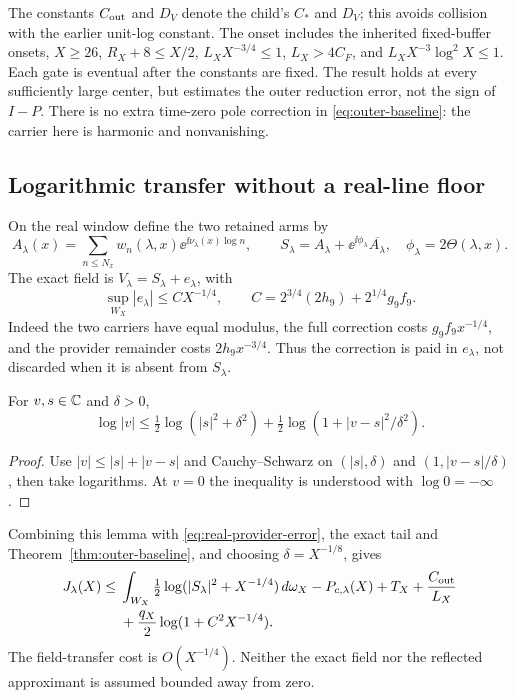 The constants \(C_{\rm out}\) and \(D_V\) denote the child's
\(C_*\) and \(D_V\); this avoids collision with the earlier
unit-log constant. The onset includes the inherited fixed-buffer
onsets, \(X\ge26\), \(R_X+8\le X/2\),
\(L_XX^{-3/4}\le1\), \(L_X>4C_F\), and
\(L_XX^{-3}\log^2X\le1\). Each gate is eventual after the constants
are fixed. The result holds at every sufficiently large center, but
estimates the outer reduction error, not the sign of \(I-P\).
There is no extra time-zero pole correction in
\eqref{eq:outer-baseline}: the carrier here is harmonic and nonvanishing.

\subsection{Logarithmic transfer without a real-line floor}
On the real window define the two retained arms by
\begin{equation}\label{eq:real-two-arms}
 A_\lambda(x)=\sum_{n\le N_x}w_n(\lambda,x)
                  \ee^{\ii\nu_\lambda(x)\log n},\qquad
 S_\lambda=A_\lambda+\ee^{\ii\phi_\lambda}\overline{A_\lambda},
 \quad\phi_\lambda=2\Theta(\lambda,x).
\end{equation}
The exact field is \(V_\lambda=S_\lambda+e_\lambda\), with
\begin{equation}\label{eq:real-provider-error}
 \sup_{W_X}|e_\lambda|\le C X^{-1/4},\qquad
 C=2^{3/4}(2h_9)+2^{1/4}g_9f_9.
\end{equation}
Indeed the two carriers have equal modulus, the full correction costs
\(g_9f_9x^{-1/4}\), and the provider remainder costs
\(2h_9x^{-3/4}\). Thus the correction is paid in \(e_\lambda\),
not discarded when it is absent from \(S_\lambda\).

\begin{lemma}\label{lem:upper-log-transfer}
For \(v,s\in\mathbb C\) and \(\delta>0\),
\begin{equation}\label{eq:upper-log-transfer}
 \log|v|\le\tfrac12\log(|s|^2+\delta^2)
       +\tfrac12\log(1+|v-s|^2/\delta^2).
\end{equation}
\end{lemma}
\begin{proof}
Use \(|v|\le|s|+|v-s|\) and Cauchy--Schwarz on
\((|s|,\delta)\) and \((1,|v-s|/\delta)\), then take logarithms.
At \(v=0\) the inequality is understood with \(\log0=-\infty\).
\end{proof}
Combining this lemma with \eqref{eq:real-provider-error}, the exact
tail and Theorem~\ref{thm:outer-baseline}, and choosing
\(\delta=X^{-1/8}\), gives
\begin{align}\label{eq:full-regularized-transfer}
 J_\lambda(X)\le{}&\int_{W_X}\tfrac12
           \log(|S_\lambda|^2+X^{-1/4})\,d\omega_X-P_{c,\lambda}(X)
            +T_X+\frac{C_{\rm out}}{L_X}\nonumber\\
 &+\frac{q_X}{2}\log(1+C^2X^{-1/4}).
\end{align}
The field-transfer cost is \(O(X^{-1/4})\). Neither the exact field
nor the reflected approximant is assumed bounded away from zero.

